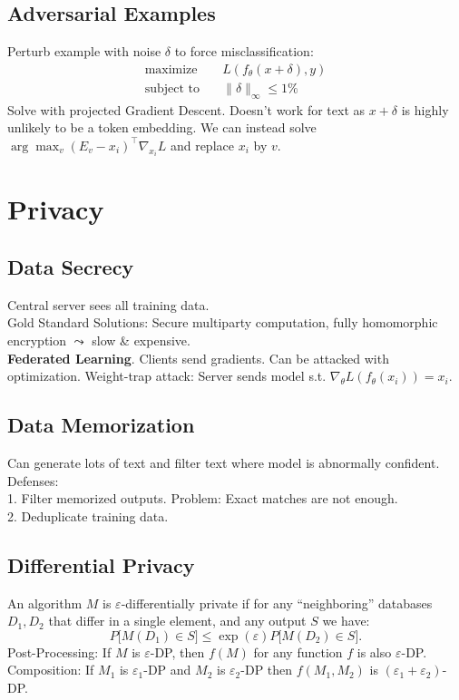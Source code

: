 \subsection*{Adversarial Examples}
Perturb example with noise $\delta$ to force misclassification:
\begin{equation*}
      \begin{aligned}
            \text{maximize}   & \quad L(f_\theta(x+\delta),y)  \\
            \text{subject to} & \quad \|\delta\|_\infty\leq1\%
      \end{aligned}
\end{equation*}
Solve with projected Gradient Descent. Doesn't work for text as $x+\delta$ is highly unlikely to be a token embedding. We can instead solve $\arg\max_v (E_v - x_i )^\top \nabla_{x_i}L$ and replace $x_i$ by $v$.

\section{Privacy}
\subsection*{Data Secrecy}
Central server sees all training data.\\
Gold Standard Solutions: Secure multiparty computation, fully homomorphic encryption $\leadsto$ slow \& expensive.\\
\textbf{Federated Learning}. Clients send gradients. Can be attacked with optimization. Weight-trap attack: Server sends model s.t. $\nabla_\theta L(f_\theta(x_i))=x_i.$\\

\subsection*{Data Memorization}
Can generate lots of text and filter text where model is abnormally confident.\\
Defenses:\\
1. Filter memorized outputs. Problem: Exact matches are not enough.\\
2. Deduplicate training data.

\subsection*{Differential Privacy}
An algorithm $M$ is $\varepsilon$-differentially private if for any “neighboring” databases $D_1,D_2$ that differ in a single element, and any output $S$ we have:
$$P\big[M(D_1)\in S\big] \leq \exp(\varepsilon) P\big[M(D_2)\in S\big].$$
Post-Processing: If $M$ is $\varepsilon$-DP, then $f(M)$ for any function $f$ is also $\varepsilon$-DP.\\
Composition: If $M_1$ is $\varepsilon_1$-DP and $M_2$ is $\varepsilon_2$-DP then $f(M_1,M_2)$ is $(\varepsilon_1+\varepsilon_2)$-DP.